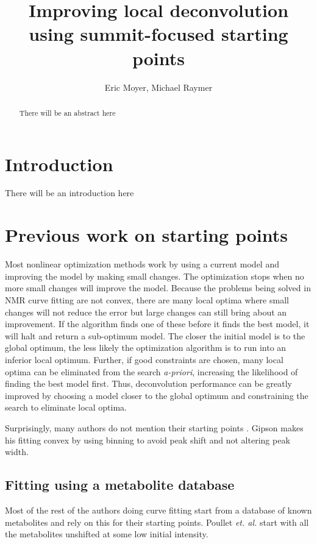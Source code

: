 \documentclass[10pt,letterpaper]{article}
\author{Eric Moyer, Michael Raymer}
\title{Improving local deconvolution using summit-focused starting points}
\begin{document}
\maketitle

\begin{abstract}
There will be an abstract here
\end{abstract}

\section{Introduction}
There will be an introduction here
\section{Previous work on starting points}
Most nonlinear optimization methods work by using a current model and improving the model by making small changes.
The optimization stops when no more small changes will improve the model. Because the problems being solved in
NMR curve fitting are not convex, there are many local optima where small changes will not reduce the error but 
large changes can still bring about an improvement. If the algorithm finds one of these before it finds the best
model, it will halt and return a sub-optimum model. The closer the initial model is to the global optimum, 
the less likely the optimization algorithm is to run into an inferior local optimum. Further, if good constraints
are chosen, many local optima can be eliminated from the search \textit{a-priori}, increasing the likelihood
of finding the best model first. Thus, deconvolution performance can be greatly improved by choosing a model 
closer to the global optimum and constraining the search to eliminate local optima.

Surprisingly, many authors do not mention their starting points \cite{Martin1994,Romano2002,Vanhamme2000}. 
Gipson\cite{Gipson2006} makes his fitting convex by using binning to avoid peak shift and not altering peak
width.

\subsection{Fitting using a metabolite database}

Most of the rest of the authors doing curve fitting start from a database of known metabolites and
rely on this for their starting points. Poullet \textit{et. al.} start with all the metabolites unshifted at 
some low initial intensity.\cite{Poullet2007} 
\end{document}
